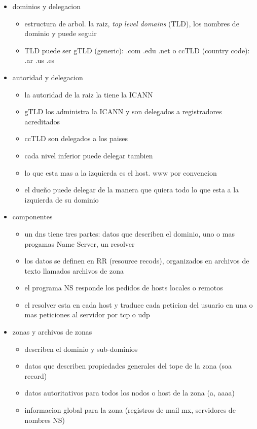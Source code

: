 \documentclass[11pt]{article}
\begin{document}
\begin{itemize}
\item dominios y delegacion
\begin{itemize}
\item estructura de arbol. la raiz, \emph{top level domains} (TLD), los nombres de dominio y puede seguir
\item TLD puede ser gTLD (generic): .com .edu .net o ccTLD (country code): .ar .us .es
\end{itemize}
\item autoridad y delegacion
\begin{itemize}
\item la autoridad de la raiz la tiene la ICANN
\item gTLD los administra la ICANN y son delegados a registradores acreditados
\item ccTLD son delegados a los paises
\item cada nivel inferior puede delegar tambien
\item lo que esta mas a la izquierda es el host. www por convencion
\item el dueño puede delegar de la manera que quiera todo lo que esta a la izquierda de su dominio
\end{itemize}
\item componentes
\begin{itemize}
\item un dns tiene tres partes: datos que describen el dominio, uno o mas progamas Name Server, un resolver
\item los datos se definen en RR (resource recods), organizados en archivos de texto llamados archivos de zona
\item el programa NS responde los pedidos de hosts locales o remotos
\item el resolver esta en cada host y traduce cada peticion del usuario en una o mas peticiones al servidor por tcp o udp
\end{itemize}
\item zonas y archivos de zonas
\begin{itemize}
\item describen el dominio y sub-dominios
\item datos que describen propiedades generales del tope de la zona (soa record)
\item datos autoritativos para todos los nodos o host de la zona (a, aaaa)
\item informacion global para la zona (registros de mail mx, servidores de nombres NS)

\end{itemize}
\end{itemize}
\end{document}
